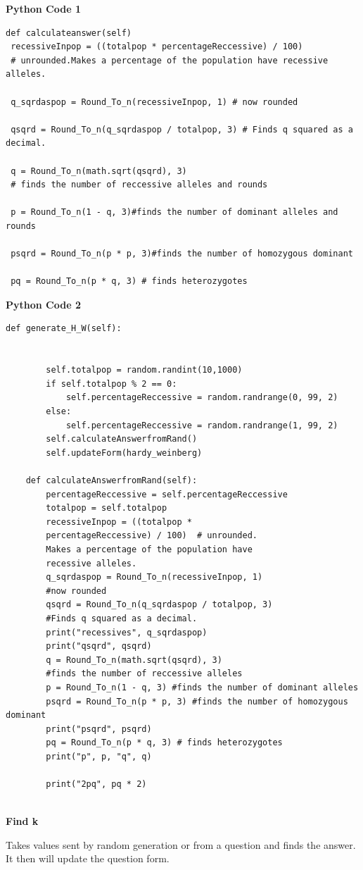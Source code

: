 \documentclass[a4paper,12pt]{report}
\begin{document}
\textbf{Python Code 1}
\begin{lstlisting}[style=customc]
def calculateanswer(self)
 recessiveInpop = ((totalpop * percentageReccessive) / 100) 
 # unrounded.Makes a percentage of the population have recessive alleles.

 q_sqrdaspop = Round_To_n(recessiveInpop, 1) # now rounded

 qsqrd = Round_To_n(q_sqrdaspop / totalpop, 3) # Finds q squared as a decimal.

 q = Round_To_n(math.sqrt(qsqrd), 3) 
 # finds the number of reccessive alleles and rounds

 p = Round_To_n(1 - q, 3)#finds the number of dominant alleles and rounds

 psqrd = Round_To_n(p * p, 3)#finds the number of homozygous dominant

 pq = Round_To_n(p * q, 3) # finds heterozygotes
\end{lstlisting}
\textbf{Python Code 2}
\begin{lstlisting}[style=customc]
def generate_H_W(self):

        
        self.totalpop = random.randint(10,1000)
        if self.totalpop % 2 == 0:
            self.percentageReccessive = random.randrange(0, 99, 2)
        else:
            self.percentageReccessive = random.randrange(1, 99, 2)
        self.calculateAnswerfromRand()
        self.updateForm(hardy_weinberg)
        
    def calculateAnswerfromRand(self):        
        percentageReccessive = self.percentageReccessive
        totalpop = self.totalpop
        recessiveInpop = ((totalpop * 
        percentageReccessive) / 100)  # unrounded. 
        Makes a percentage of the population have
        recessive alleles. 
        q_sqrdaspop = Round_To_n(recessiveInpop, 1)
        #now rounded
        qsqrd = Round_To_n(q_sqrdaspop / totalpop, 3) 
        #Finds q squared as a decimal.
        print("recessives", q_sqrdaspop)
        print("qsqrd", qsqrd)
        q = Round_To_n(math.sqrt(qsqrd), 3) 
        #finds the number of reccessive alleles
        p = Round_To_n(1 - q, 3) #finds the number of dominant alleles
        psqrd = Round_To_n(p * p, 3) #finds the number of homozygous dominant
        print("psqrd", psqrd)
        pq = Round_To_n(p * q, 3) # finds heterozygotes
        print("p", p, "q", q)

        print("2pq", pq * 2)
        
\end{lstlisting}
\begin{flushleft}

\textbf{Find k}

Takes values sent by random generation or from a question and finds the answer. It then will update the question form.
\end{flushleft}
\end{document}
